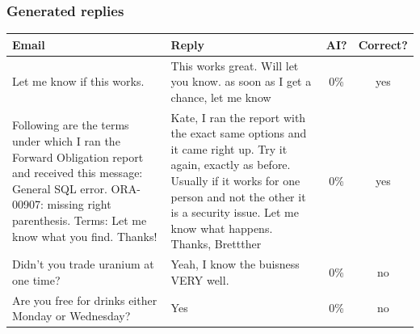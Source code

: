 \documentclass{beamer}
\begin{document}
\begin{frame}
  \frametitle{Generated replies}

  \begin{table}
    \scriptsize
    \begin{tabularx}{\textwidth}{|X|X|c|c|}
      \hline
      \textbf{Email}                                                                                                                                                                                        & \textbf{Reply}                                                                                                                                                                                                                     & \textbf{AI?} & \textbf{Correct?} \\
      \hline
      Let me know if this works.                                                                                                                                                                            & This works great. Will let you know. as soon as I get a chance, let me know                                                                                                                                                        & \num{0}{\%}  & yes               \\
      \hline
      Following are the terms under which I ran the Forward Obligation report and received this message: General SQL error. ORA-00907: missing right parenthesis. Terms: Let me know what you find. Thanks! & Kate, I ran the report with the exact same options and it came right up. Try it again, exactly as before. Usually if it works for one person and not the other it is a security issue. Let me know what happens. Thanks, Brettther & \num{0}{\%}  & yes               \\
      \hline
      Didn't you trade uranium at one time?                                                                                                                                                                 & Yeah, I know the buisness VERY well.                                                                                                                                                                                               & \num{0}{\%}  & no                \\
      \hline
      Are you free for drinks either Monday or Wednesday?                                                                                                                                                   & Yes                                                                                                                                                                                                                                & \num{0}{\%}  & no                \\

\end{tabularx}
\end{table}
\end{frame}
\end{document}
